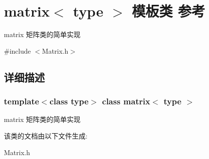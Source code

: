 \hypertarget{classmatrix}{}\section{matrix$<$ type $>$ 模板类 参考}
\label{classmatrix}


matrix 矩阵类的简单实现  




{\ttfamily \#include $<$Matrix.\+h$>$}



\subsection{详细描述}
\subsubsection*{template$<$class type$>$\newline
class matrix$<$ type $>$}

matrix 矩阵类的简单实现 

该类的文档由以下文件生成\+:\begin{DoxyCompactItemize}
\item 
Matrix.\+h\end{DoxyCompactItemize}
